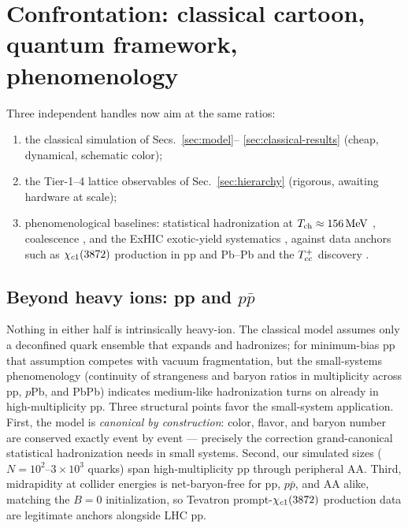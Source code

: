\section{Confrontation: classical cartoon, quantum framework, phenomenology}
\label{sec:confrontation}

Three independent handles now aim at the same ratios:

\begin{enumerate}
\item the classical simulation of Secs.~\ref{sec:model}--%
\ref{sec:classical-results} (cheap, dynamical, schematic color);
\item the Tier-1--4 lattice observables of Sec.~\ref{sec:hierarchy}
(rigorous, awaiting hardware at scale);
\item phenomenological baselines: statistical hadronization at
$T_{\rm ch}\approx156\,\mathrm{MeV}$ \cite{Andronic:2017pug}, coalescence
\cite{Fries:2008hs}, and the ExHIC exotic-yield systematics
\cite{ExHIC:2010gcb,ExHIC:2017smd,Zhang:2020dwn}, against data anchors such as
$\chi_{c1}(3872)$ production in pp and Pb--Pb \cite{CMS:2021znk,LHCb:2021auc} and
the $T_{cc}^{+}$ discovery \cite{LHCb:2021vvq}.
\end{enumerate}

\subsection{Beyond heavy ions: pp and \texorpdfstring{$p\bar p$}{ppbar}}

Nothing in either half is intrinsically heavy-ion.  The classical model
assumes only a deconfined quark ensemble that expands and hadronizes;
for minimum-bias pp that assumption competes with vacuum fragmentation,
but the small-systems phenomenology (continuity of strangeness and
baryon ratios in multiplicity across pp, $p$Pb, and PbPb) indicates
medium-like hadronization turns on already in high-multiplicity pp.
Three structural points favor the small-system application.  First, the
model is \emph{canonical by construction}: color, flavor, and baryon
number are conserved exactly event by event --- precisely the
correction grand-canonical statistical hadronization needs in small
systems.  Second, our simulated sizes ($N=10^2$--$3\times10^3$ quarks)
span high-multiplicity pp through peripheral AA.  Third, midrapidity at
collider energies is net-baryon-free for pp, $p\bar p$, and AA alike,
matching the $B=0$ initialization, so Tevatron prompt-$\chi_{c1}(3872)$
production data are legitimate anchors alongside LHC pp.

